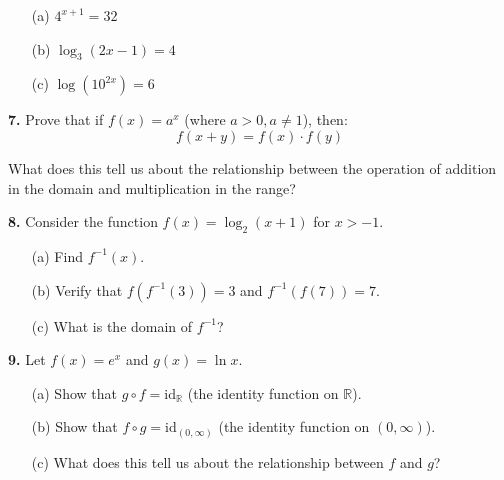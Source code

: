 \documentclass[12pt]{article}
\begin{document}
\begin{enumerate}
\item[(a)] $4^{x+1} = 32$
\vspace{3cm}

\item[(b)] $\log_3(2x - 1) = 4$
\vspace{3cm}

\item[(c)] $\log(10^{2x}) = 6$
\vspace{3cm}
\end{enumerate}

\textbf{7.} Prove that if $f(x) = a^x$ (where $a > 0, a \neq 1$), then:
$$f(x + y) = f(x) \cdot f(y)$$

What does this tell us about the relationship between the operation of addition in the domain and multiplication in the range?
\vspace{4cm}

\textbf{8.} Consider the function $f(x) = \log_2(x + 1)$ for $x > -1$.

\begin{enumerate}
\item[(a)] Find $f^{-1}(x)$.
\vspace{3cm}

\item[(b)] Verify that $f(f^{-1}(3)) = 3$ and $f^{-1}(f(7)) = 7$.
\vspace{3cm}

\item[(c)] What is the domain of $f^{-1}$?
\vspace{2cm}
\end{enumerate}

\textbf{9.} Let $f(x) = e^x$ and $g(x) = \ln x$. 

\begin{enumerate}
\item[(a)] Show that $g \circ f = \text{id}_{\mathbb{R}}$ (the identity function on $\mathbb{R}$).
\vspace{3cm}

\item[(b)] Show that $f \circ g = \text{id}_{(0,\infty)}$ (the identity function on $(0,\infty)$).
\vspace{3cm}

\item[(c)] What does this tell us about the relationship between $f$ and $g$?
\vspace{2cm}
\end{enumerate}
\end{document}
